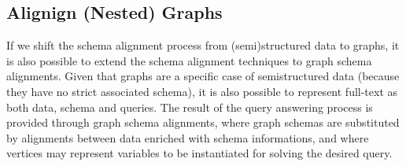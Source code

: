 \subsection{Alignign (Nested) Graphs}\label{sss:ngdi}
If we shift the schema alignment process from (semi)structured data to graphs, it
is also possible to extend the schema alignment techniques to graph schema alignments. Given that graphs are a specific case of semistructured data (because they have no strict associated schema), it is also possible to represent full-text as both data, schema and queries. The result of the query answering process is provided through graph schema alignments, where graph schemas are substituted by alignments between data enriched with schema informations, and where vertices may represent variables to be instantiated for solving the desired query.

